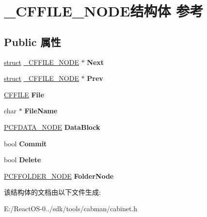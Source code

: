 \hypertarget{struct___c_f_f_i_l_e___n_o_d_e}{}\section{\+\_\+\+C\+F\+F\+I\+L\+E\+\_\+\+N\+O\+D\+E结构体 参考}
\label{struct___c_f_f_i_l_e___n_o_d_e}
\subsection*{Public 属性}
\begin{DoxyCompactItemize}
\item 
\mbox{\label{struct___c_f_f_i_l_e___n_o_d_e_a56cc849ca5c2f8f1d1672f0b6450bb1f}} 
\hyperlink{interfacestruct}{struct} \hyperlink{struct___c_f_f_i_l_e___n_o_d_e}{\+\_\+\+C\+F\+F\+I\+L\+E\+\_\+\+N\+O\+DE} $\ast$ {\bfseries Next}
\item 
\mbox{\label{struct___c_f_f_i_l_e___n_o_d_e_aa5dd8f09e35abf779b3abbebe69dde63}} 
\hyperlink{interfacestruct}{struct} \hyperlink{struct___c_f_f_i_l_e___n_o_d_e}{\+\_\+\+C\+F\+F\+I\+L\+E\+\_\+\+N\+O\+DE} $\ast$ {\bfseries Prev}
\item 
\mbox{\label{struct___c_f_f_i_l_e___n_o_d_e_a65c7de19ba0f0f9d0d170afe6d4b1946}} 
\hyperlink{struct_c_f_f_i_l_e}{C\+F\+F\+I\+LE} {\bfseries File}
\item 
\mbox{\label{struct___c_f_f_i_l_e___n_o_d_e_ad4c19081a104a778830f49bac63feb76}} 
char $\ast$ {\bfseries File\+Name}
\item 
\mbox{\label{struct___c_f_f_i_l_e___n_o_d_e_aa715babf81613b2394f58e6f38bffd0f}} 
\hyperlink{struct___c_f_d_a_t_a___n_o_d_e}{P\+C\+F\+D\+A\+T\+A\+\_\+\+N\+O\+DE} {\bfseries Data\+Block}
\item 
\mbox{\label{struct___c_f_f_i_l_e___n_o_d_e_aa5bf487d00cce780d79bae8197feb3da}} 
bool {\bfseries Commit}
\item 
\mbox{\label{struct___c_f_f_i_l_e___n_o_d_e_a76c15423b6398742de2ebfdf08bb746e}} 
bool {\bfseries Delete}
\item 
\mbox{\label{struct___c_f_f_i_l_e___n_o_d_e_adf4eafac7043ce25b3df81e40c325936}} 
\hyperlink{struct___c_f_f_o_l_d_e_r___n_o_d_e}{P\+C\+F\+F\+O\+L\+D\+E\+R\+\_\+\+N\+O\+DE} {\bfseries Folder\+Node}
\end{DoxyCompactItemize}


该结构体的文档由以下文件生成\+:\begin{DoxyCompactItemize}
\item 
E\+:/\+React\+O\+S-\/0../sdk/tools/cabman/cabinet.\+h\end{DoxyCompactItemize}
